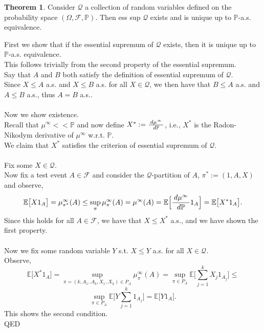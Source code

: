 \documentclass[12pt]{article}
\newcommand{\cF}{\mathcal{F}}
\newcommand{\E}{\mathbb{E}}
\newcommand{\Prb}{\mathbb{P}}
\newcommand{\df}[1]{\hspace{2 px} d #1 \hspace{2 px}}
\newcommand{\PS}{(\Omega, \cF, \Prb)}
\newcommand{\QED}{\hspace*{\fill}\textup{QED}}
\theoremstyle{definition}
\newtheorem{thm}{Theorem}
\begin{document}
\begin{thm} \cite{karatzas1998}
    Consider $\mathcal{Q}$ a collection of random variables defined on the probability space $\PS$.
    Then ess sup $\mathcal{Q}$ exists and is unique up to $\Prb$-a.s. equivalence.

    \proof
    First we show that if the essential supremum of $\mathcal{Q}$ exists, then it is unique up to $\Prb$-a.s. equivalence. \\
    This follows trivially from the second property of the essential supremum. \\
    Say that $A$ and $B$ both satisfy the definition of essential supremum of $\mathcal{Q}$. \\
    Since $X \leq A$ a.s. and $X \leq B$ a.s. for all $X \in \mathcal{Q}$, we then have that $B \leq A$ a.s. and $A \leq B$ a.s., thus $A = B$ a.s.. \\
    \\
    Now we show existence. \\
    Recall that $\mu^\infty << \Prb$ and now define $X^* := \frac{\df{\mu^\infty}}{\df{\Prb}}$, i.e., $X^*$ is the Radon-Nikodym derivative of $\mu^\infty$ w.r.t. $\Prb$. \\
    We claim that $X^*$ satisfies the criterion of essential supremum of $\mathcal{Q}$. \\
    \\
    Fix some $X \in \mathcal{Q}$. \\
    Now fix a test event $A \in \cF$ and consider the $\mathcal{Q}$-partition of $A$, $\pi^* := (1, A, X)$ and observe,
    \[
        \E \big [X 1_A \big ] = \mu_{\pi^*}^\infty(A) \leq \sup_{\pi} \mu_\pi^\infty(A) = \mu^\infty(A) = \E \Big [\frac{\df{\mu^\infty}}{\df{\Prb}} 1_A \Big ] = \E \big [X^* 1_A \big ].
    \]
    Since this holds for all $A \in \cF$, we have that $X \leq X^*$ a.s., and we have shown the first property. \\
    \\
    Now we fix some random variable $Y$ s.t. $X \leq Y$ a.s. for all $X \in \mathcal{Q}$. \\
    Observe,
    \[
        \E \big [X^* 1_A \big ] =
        \sup_{\pi = (k, A_1 .. A_k , X_1 .. X_k) \in P_A } \mu_\pi^\infty (A) =
        \sup_{\pi \in P_A} \E \bigg [\sum_{j=1}^k X_j 1_{A_j} \bigg ]  \leq
    \]
    \[
        \sup_{\pi \in P_A} \E \bigg [ Y \sum_{j=1}^k 1_{A_j} \bigg ] = \E \big [ Y 1_{A} \big ].
    \]
    This shows the second condition. \\
    \QED
\end{thm}
\end{document}
